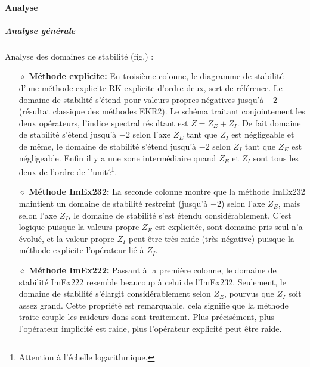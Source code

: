         \paragraph{Analyse}
            \subparagraph{Analyse générale}\label{par:analyse_generale_stab_nagumo}
                Analyse des domaines de stabilité (fig.) :
                \begin{itemize}
                    \item[$\diamond$]\textbf{Méthode explicite:} En troisième colonne, le diagramme de stabilité d'une méthode explicite RK explicite d'ordre deux, sert de référence. 
                        Le domaine de stabilité s'étend pour valeurs propres négatives jusqu'à $-2$ (résultat classique des méthodes EKR2).
                        Le schéma traitant conjointement les deux opérateurs, l'indice spectral résultant est $Z=Z_E+Z_I$. 
                        De fait domaine de stabilité s'étend jusqu'à $-2$ selon l'axe $Z_E$ tant que $Z_I$ est négligeable et de même,
                        le domaine de stabilité s'étend jusqu'à $-2$ selon $Z_I$ tant que $Z_E$ est négligeable. 
                        Enfin il y a une zone intermédiaire quand $Z_E$ et $Z_I$ sont tous les deux de l'ordre de l'unité\footnote{Attention à l'échelle logarithmique.}.

                    \item[$\diamond$]\textbf{Méthode ImEx232:} La seconde colonne montre que la méthode ImEx232 maintient un domaine de stabilité restreint (jusqu'à $-2$) selon l'axe $Z_E$,
                        mais selon l'axe $Z_I$, le domaine de stabilité s'est étendu considérablement. C'est logique puisque la valeurs propre $Z_E$ est explicitée,
                        sont domaine pris seul n'a évolué, et la valeur propre $Z_I$ peut être très raide (très négative) puisque la méthode explicite l'opérateur lié à $Z_I$.

                    \item[$\diamond$]\textbf{Méthode ImEx222:} Passant à la première colonne, le domaine de stabilité ImEx222 resemble beaucoup à celui de l'ImEx232. Seulement, le domaine de stabilité s'élargit considérablement
                        selon $Z_E$, pourvus que $Z_I$ soit assez grand. Cette propriété est remarquable, cela signifie que la méthode traite couple les raideurs dans sont traitement. 
                        Plus précisément, plus l'opérateur implicité est raide, plus l'opérateur explicité peut être raide.
                \end{itemize}
